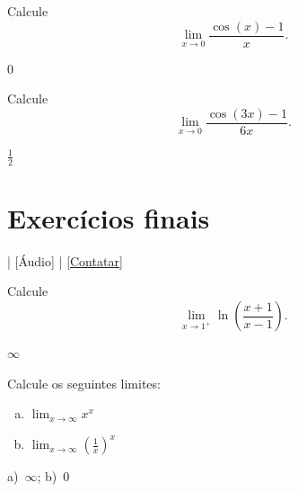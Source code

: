 \begin{exer}\label{exer:lim_cosx_1}
  Calcule
  \begin{equation}
    \lim_{x\to 0} \frac{\cos(x)-1}{x}.
  \end{equation}
\end{exer}
\begin{resp}
  $0$
\end{resp}

\begin{exer}
  Calcule
  \begin{equation}
    \lim_{x\to 0} \frac{\cos(3x)-1}{6x}.
  \end{equation}
\end{exer}
\begin{resp}
  $\frac{1}{2}$
\end{resp}

\section{Exercícios finais}\label{cap_lim_sec_exfinal}

\begin{flushright}
  [Vídeo] | [Áudio] | \href{https://phkonzen.github.io/notas/contato.html}{[Contatar]}
\end{flushright}

\begin{exer}
  Calcule
  \begin{equation}
    \lim_{x\to 1^+} \ln\left(\frac{x+1}{x-1}\right).
  \end{equation}
\end{exer}
\begin{resp}
  $\infty$
\end{resp}

\begin{exer}
  Calcule os seguintes limites:
  \begin{enumerate}[a)]
  \item $\displaystyle\lim_{x\to\infty} x^x$
  \item $\displaystyle\lim_{x\to\infty} \left(\frac{1}{x}\right)^x$
  \end{enumerate}
\end{exer}
\begin{resp}
  a)~$\infty$; b)~$0$
\end{resp}
